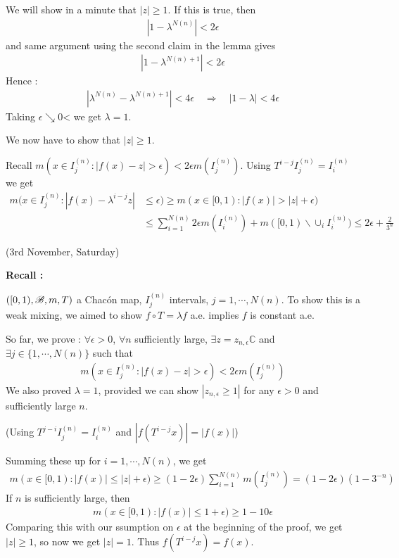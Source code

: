 \documentclass[10pt,a4paper]{report}
\newenvironment{proof}
{\begin{changemargin}{1cm}{0.5cm} 
	}%
	{\end{changemargin}
}
\newenvironment{subproof}
{\begin{changemargin}{0.5cm}{0.5cm}
	}%
	{\end{changemargin}
}
\begin{document}
\begin{proof}
\quad We will show in a minute that $|z| \geq 1$. If this is true, then
\begin{align*}
|1-\lambda^{N(n)}| < 2\epsilon
\end{align*} 
and same argument using the second claim in the lemma gives
\begin{align*}
|1- \lambda^{N(n)+1}| < 2\epsilon
\end{align*}
Hence :
\begin{align*}
|\lambda^{N(n)} - \lambda^{N(n)+1}| < 4\epsilon \quad \Rightarrow \quad |1-\lambda| < 4\epsilon
\end{align*}
Taking $\epsilon \searrow 0$< we get $\lambda =1$.

We now have to show that $|z| \geq 1$.
\begin{subproof}
 Recall $m(x\in I^{(n)}_j : |f(x)-z| > \epsilon) < 2\epsilon m(I^{(n)}_j)$. Using $T^{i-j}I_j^{(n)} = I^{(n)}_i$ we get
\begin{align*}
m(x\in I^{(n)}_j : |f(x) - \lambda^{i-j} z| &\leq \epsilon) \geq m(x\in [0,1) : |f(x)| > |z|+ \epsilon) \\
&\leq \sum_{i=1}^{N(n)} 2\epsilon m(I^{(n)}_i) + m([0,1) \backslash \cup_i I_i^{(n)}) \leq 2\epsilon + \frac{2}{3^n}
\end{align*}
\end{subproof}
\end{proof}
\s

\newday

(3rd November, Saturday)
\s

\textbf{Recall :}

$([0,1),\mathscr{B},m,T)$ a Chac\'{o}n map, $I_j^{(n)}$ intervals, $j=1,\cdots, N(n)$. To show this is a weak mixing, we aimed to show $f\circ T = \lambda f$ a.e. implies $f$ is constant a.e.
\s

So far, we prove : $\forall \epsilon >0$, $\forall n$ sufficiently large, $\exists z = z_{n,\epsilon} \mathbb{C}$ and $\exists j \in \{1, \cdots, N(n)\}$ such that
\begin{align*}
m(x\in I_j^{(n)}: |f(x) -z| > \epsilon ) < 2\epsilon m(I_j^{(n)})
\end{align*}
We also proved $\lambda =1$, provided we can show $|z_{n,\epsilon} \geq 1|$ for any $\epsilon >0$ and sufficiently large $n$.

(Using $T^{j-i}I_j^{(n)} = I_i^{(n)}$ and $|f(T^{i-j}x)| = |f(x)|$)
\s

\quad Summing these up for $i=1,\cdots, N(n)$, we get
\begin{align*}
m(x\in [0,1) : |f(x)| \leq |z| +\epsilon) \geq (1-2\epsilon) \sum_{i=1}^{N(n)} m(I^{(n)}_j) = (1-2\epsilon) (1-3^{-n})
\end{align*}
If $n$ is sufficiently large, then
\begin{align*}
m(x\in[0,1) : |f(x)| \leq 1+ \epsilon) \geq 1-10\epsilon
\end{align*}
Comparing this with our ssumption on $\epsilon$ at the beginning of the proof, we get $|z| \geq 1$, so now we get $|z| =1$. Thus $f(T^{i-j}x) = f(x)$.
\end{document}
